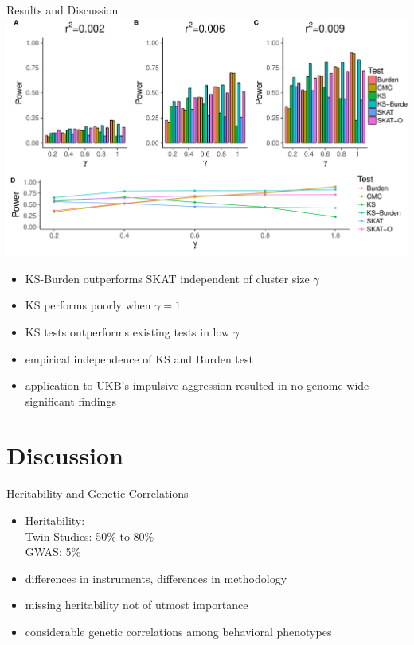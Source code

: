 \documentclass{beamer}
\begin{document}
\begin{frame}[t]{Results and Discussion}
  \tiny
  \includegraphics[width=0.8\linewidth]{../ksburden/figures/combined_power_analysis.pdf}
  \begin{itemize}
    \item KS-Burden outperforms SKAT independent of cluster size $\gamma$
    \item KS performs poorly when $\gamma=1$
    \item KS tests outperforms existing tests in low $\gamma$
    \item empirical independence of KS and Burden test
    \item application to UKB's impulsive aggression resulted in no genome-wide significant findings
  \end{itemize}
\end{frame}

\section{Discussion}

\begin{frame}[t]{Heritability and Genetic Correlations}
  \begin{itemize}
    \item Heritability:\\
      Twin Studies: 50\% to 80\% \\
      GWAS: 5\%
    \item differences in instruments, differences in methodology
    \item missing heritability not of utmost importance
    \item considerable genetic correlations among behavioral phenotypes
  \end{itemize}
\end{frame}
\end{document}
